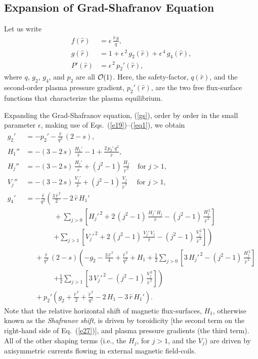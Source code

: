 \documentclass[12pt,prb,aps]{revtex4-1}
\begin{document}
\subsection{Expansion of Grad-Shafranov Equation}\label{exp}
Let us write
\begin{align}\label{e26v}
f(\hat{r})&= \epsilon\,\frac{\hat{r}\,g}{q},\\[0.5ex]
g(\hat{r}) &= 1+ \epsilon^{\,2}\,g_2(\hat{r}) + \epsilon^{\,4}\,g_4(\hat{r}),\label{e27v}\\[0.5ex]
P'(\hat{r}) &= \epsilon^{\,2}\,p_2'(\hat{r}),\label{eq1}
\end{align}
where $q$,  $g_2$, $g_4$, and $p_2$ are all ${\cal O}(1)$. Here, the safety-factor, $q(\hat{r})$, and the second-order plasma
pressure gradient, $p_2'(\hat{r})$, are the two free flux-surface functions that characterize the plasma equilibrium.\cite{gs1} 

Expanding the Grad-Shafranov equation, (\ref{gs}), order by order in the
small parameter $\epsilon$, making use of Eqs.~(\ref{e19})--(\ref{eq1}), we obtain\,\cite{con0,connor,gim,fitz2024}
\begin{align}
g_2'&=- p_2' - \frac{\hat{r}}{q^2}\,(2-s),\label{e26}\\[0.5ex]
H_1''&= -(3-2\,s)\,\frac{H_1' }{\hat{r}}
-1+\frac{2\,p_2'\,q^2}{\hat{r}},\label{e27}\\[0.5ex]
H_j''&= -(3-2\,s)\,\frac{H_j'}{\hat{r}}+(j^2-1)\,\frac{H_j}{\hat{r}^{\,2}}~~~~~\mbox{for $j>1$},\label{e33x}\\[0.5ex]
V_j''&= -(3-2\,s)\,\frac{V_j'}{\hat{r}}+(j^2-1)\,\frac{V_j}{\hat{r}^{\,2}}~~~~~~\mbox{for $j>1$},\label{e28}\\[0.5ex]
g_4'&= -\frac{\hat{r}}{q^2}\left(
\frac{3\,\hat{r}^{\,2}}{2}-2\,\hat{r}\,H_1'\right.\nonumber\\[0.5ex]
&\phantom{===}
+\sum_{j>0}\left[H_j'^{\,2}+2\,(j^2-1)\,\frac{H_j'\,H_j}{\hat{r}}-(j^2-1)\,\frac{H_j^{\,2}}{\hat{r}^{\,2}}\right]\nonumber\\[0.5ex]
&\phantom{===}\left.+\sum_{j>1}\left[V_j'^{\,2}+2\,(j^2-1)\,\frac{V_j'\,V_j}{\hat{r}}-(j^2-1)\,\frac{V_j^{\,2}}{\hat{r}^{\,2}}\right]\right)\nonumber\\[0.5ex]
&\phantom{=}
+\frac{\hat{r}}{q^2}\,(2-s)\left(-g_2-\frac{3\,\hat{r}^{\,2}}{4} +\frac{\hat{r}^{\,2}}{q^2}+H_1 +\frac{1}{2}\sum_{j>0}\left[3\,H_j'^{\,2}- (j^2-1)\,\frac{H_j^{\,2}}{\hat{r}^{\,2}}\right]
\right.\nonumber\\[0.5ex]
&\phantom{===}\left.+\frac{1}{2}\sum_{j>1}\left[3\,V_j'^{\,2}- (j^2-1)\,\frac{V_j^{\,2}}{\hat{r}^{\,2}}\right]\right)\nonumber\\[0.5ex]
&\phantom{=}
+p_2'\left(g_2+\frac{\hat{r}^{\,2}}{2}+\frac{\hat{r}^{\,2}}{q^2}-2\,H_1-3\,\hat{r}\,H_1'\right).\label{e31}
\end{align}
Note that the relative horizontal shift of magnetic flux-surfaces, $H_1$, otherwise known as the {\em Shafranov shift},\cite{shaf} is driven by toroidicity [the second term on
the right-hand side of Eq.~(\ref{e27})], and plasma pressure gradients (the third term). All of the other shaping terms (i.e., the $H_j$, for $j>1$, and
the $V_j$) are driven by axisymmetric currents flowing in external  magnetic field-coils.\cite{fitz2024} 
\end{document}
